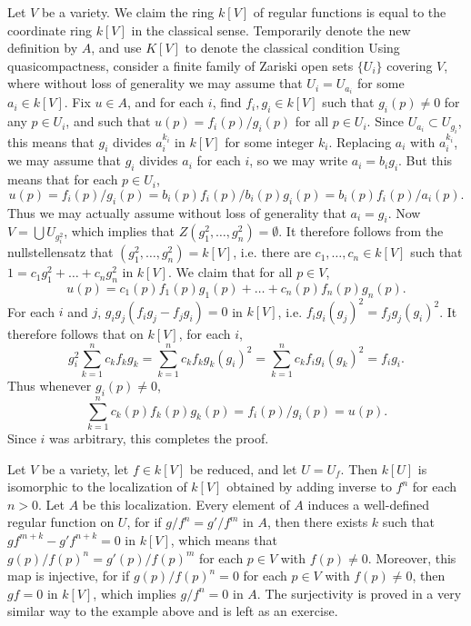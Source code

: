 \begin{example}
    Let $V$ be a variety. We claim the ring $k[V]$ of regular functions is equal to the coordinate ring $k[V]$ in the classical sense. Temporarily denote the new definition by $A$, and use $K[V]$ to denote the classical condition Using quasicompactness, consider a finite family of Zariski open sets $\{ U_i \}$ covering $V$, where without loss of generality we may assume that $U_i = U_{a_i}$ for some $a_i \in k[V]$. Fix $u \in A$, and for each $i$, find $f_i,g_i \in k[V]$ such that $g_i(p) \neq 0$ for any $p \in U_i$, and such that $u(p) = f_i(p)/g_i(p)$ for all $p \in U_i$. Since $U_{a_i} \subset U_{g_i}$, this means that $g_i$ divides $a_i^{k_i}$ in $k[V]$ for some integer $k_i$. Replacing $a_i$ with $a_i^{k_i}$, we may assume that $g_i$ divides $a_i$ for each $i$, so we may write $a_i = b_i g_i$. But this means that for each $p \in U_i$,
    \[ u(p) = f_i(p)/g_i(p) = b_i(p) f_i(p) / b_i(p) g_i(p) = b_i(p) f_i(p) / a_i(p). \]
    Thus we may actually assume without loss of generality that $a_i = g_i$. Now $V = \bigcup U_{g_i^2}$, which implies that $Z(g_1^2,\dots,g_n^2) = \emptyset$. It therefore follows from the nullstellensatz that $(g_1^2,\dots,g_n^2) = k[V]$, i.e. there are $c_1,\dots,c_n \in k[V]$ such that $1 = c_1g_1^2 + \dots + c_ng_n^2$ in $k[V]$. We claim that for all $p \in V$,
    \[ u(p) = c_1(p) f_1(p) g_1(p) + \dots + c_n(p) f_n(p) g_n(p). \]
    For each $i$ and $j$, $g_ig_j(f_ig_j - f_jg_i) = 0$ in $k[V]$, i.e. $f_ig_i (g_j)^2 = f_jg_j (g_i)^2$. It therefore follows that on $k[V]$, for each $i$,
    \[ g_i^2 \sum_{k = 1}^n c_k f_k g_k = \sum_{k = 1}^n c_k f_k g_k (g_i)^2 = \sum_{k = 1}^n c_k f_i g_i (g_k)^2 = f_i g_i. \]
    Thus whenever $g_i(p) \neq 0$,
    \[ \sum_{k = 1}^n c_k(p) f_k(p) g_k(p) = f_i(p) / g_i(p) = u(p). \]
    Since $i$ was arbitrary, this completes the proof.
\end{example}

\begin{example}
    Let $V$ be a variety, let $f \in k[V]$ be reduced, and let $U = U_f$. Then $k[U]$ is isomorphic to the localization of $k[V]$ obtained by adding inverse to $f^n$ for each $n > 0$. Let $A$ be this localization. Every element of $A$ induces a well-defined regular function on $U$, for if $g/f^n = g'/f^m$ in $A$, then there exists $k$ such that $gf^{m+k} - g'f^{n+k} = 0$ in $k[V]$, which means that $g(p)/f(p)^n = g'(p)/f(p)^m$ for each $p \in V$ with $f(p) \neq 0$. Moreover, this map is injective, for if $g(p)/f(p)^n = 0$ for each $p \in V$ with $f(p) \neq 0$, then $gf = 0$ in $k[V]$, which implies $g/f^n = 0$ in $A$. The surjectivity is proved in a very similar way to the example above and is left as an exercise.
\end{example}

